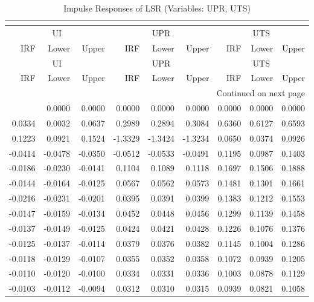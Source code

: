 \begin{longtable}{rrrrrrrrr}
\caption{Impulse Responses of LSR (Variables: UPR, UTS)}\\
\label{tab:lsr_irf_group2}\\
\toprule
\multicolumn{3}{c}{UI} & \multicolumn{3}{c}{UPR} & \multicolumn{3}{c}{UTS} \\
IRF & Lower & Upper & IRF & Lower & Upper & IRF & Lower & Upper \\
\midrule
\endfirsthead
\toprule
\multicolumn{3}{c}{UI} & \multicolumn{3}{c}{UPR} & \multicolumn{3}{c}{UTS} \\
IRF & Lower & Upper & IRF & Lower & Upper & IRF & Lower & Upper \\
\midrule
\endhead
\midrule
\multicolumn{9}{r}{Continued on next page} \\
\midrule
\endfoot
\bottomrule
\endlastfoot
0.0000 & 0.0000 & 0.0000 & 0.0000 & 0.0000 & 0.0000 & 0.0000 & 0.0000 & 0.0000 \\
0.0334 & 0.0032 & 0.0637 & 0.2989 & 0.2894 & 0.3084 & 0.6360 & 0.6127 & 0.6593 \\
0.1223 & 0.0921 & 0.1524 & -1.3329 & -1.3424 & -1.3234 & 0.0650 & 0.0374 & 0.0926 \\
-0.0414 & -0.0478 & -0.0350 & -0.0512 & -0.0533 & -0.0491 & 0.1195 & 0.0987 & 0.1403 \\
-0.0186 & -0.0230 & -0.0141 & 0.1104 & 0.1089 & 0.1118 & 0.1697 & 0.1506 & 0.1888 \\
-0.0144 & -0.0164 & -0.0125 & 0.0567 & 0.0562 & 0.0573 & 0.1481 & 0.1301 & 0.1661 \\
-0.0216 & -0.0231 & -0.0201 & 0.0395 & 0.0391 & 0.0399 & 0.1383 & 0.1212 & 0.1553 \\
-0.0147 & -0.0159 & -0.0134 & 0.0452 & 0.0448 & 0.0456 & 0.1299 & 0.1139 & 0.1458 \\
-0.0137 & -0.0149 & -0.0125 & 0.0424 & 0.0421 & 0.0428 & 0.1226 & 0.1076 & 0.1376 \\
-0.0125 & -0.0137 & -0.0114 & 0.0379 & 0.0376 & 0.0382 & 0.1145 & 0.1004 & 0.1286 \\
-0.0118 & -0.0129 & -0.0107 & 0.0355 & 0.0352 & 0.0358 & 0.1072 & 0.0939 & 0.1205 \\
-0.0110 & -0.0120 & -0.0100 & 0.0334 & 0.0331 & 0.0336 & 0.1003 & 0.0878 & 0.1129 \\
-0.0103 & -0.0112 & -0.0094 & 0.0312 & 0.0310 & 0.0315 & 0.0939 & 0.0821 & 0.1058 \\
\end{longtable}